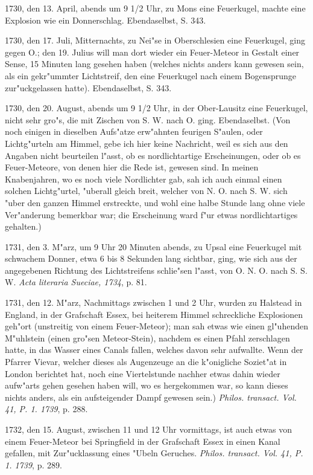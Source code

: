 \documentclass[a4paper, 11pt, oneside, polutonikogreek, german]{article}
\begin{document}
1730, den 13. April, abends um 9 1/2 Uhr, zu Mons eine Feuerkugel, machte eine Explosion wie ein Donnerschlag. Ebendaselbst, S. 343.

1730, den 17. Juli, Mitternachts, zu Nei"se in Oberschlesien eine Feuerkugel, ging gegen O.; den 19. Julius will man dort wieder ein Feuer-Meteor in Gestalt einer Sense, 15 Minuten lang gesehen haben (welches nichts anders kann gewesen sein, als ein gekr"ummter Lichtstreif, den eine Feuerkugel nach einem Bogensprunge zur"uckgelassen hatte). Ebendaselbst, S. 343.

1730, den 20. August, abends um 9 1/2 Uhr, in der Ober-Lausitz eine Feuerkugel, nicht sehr gro"s, die mit Zischen von S. W. nach O. ging. Ebendaselbst. (Von noch einigen in dieselben Aufs"atze erw"ahnten feurigen S"aulen, oder Lichtg"urteln am Himmel, gebe ich hier keine Nachricht, weil es sich aus den Angaben nicht beurteilen l"asst, ob es nordlichtartige Erscheinungen, oder ob es Feuer-Meteore, von denen hier die Rede ist, gewesen sind. In meinen Knabenjahren, wo es noch viele Nordlichter gab, sah ich auch einmal einen solchen Lichtg"urtel, "uberall gleich breit, welcher von N. O. nach S. W. sich "uber den ganzen Himmel erstreckte, und wohl eine halbe Stunde lang ohne viele Ver"anderung bemerkbar war; die Erscheinung ward f"ur etwas nordlichtartiges gehalten.)

1731, den 3. M"arz, um 9 Uhr 20 Minuten abends, zu Upsal eine Feuerkugel mit schwachem Donner, etwa 6 bis 8 Sekunden lang sichtbar, ging, wie sich aus der angegebenen Richtung des Lichtstreifens schlie"sen l"asst, von O. N. O. nach S. S. W. \emph{Acta literaria Sueciae, 1734}, p. 81.

1731, den 12. M"arz, Nachmittags zwischen 1 und 2 Uhr, wurden zu Halstead in England, in der Grafschaft Essex, bei heiterem Himmel schreckliche Explosionen geh"ort (unstreitig von einem Feuer-Meteor); man sah etwas wie einen gl"uhenden M"uhlstein (einen gro"sen Meteor-Stein), nachdem es einen Pfahl zerschlagen hatte, in das Wasser eines Canals fallen, welches davon sehr aufwallte. Wenn der Pfarrer Vievar, welcher dieses als Augenzeuge an die k"onigliche Soziet"at in London berichtet hat, noch eine Viertelstunde nachher etwas dahin wieder aufw"arts gehen gesehen haben will, wo es hergekommen war, so kann dieses nichts anders, als ein aufsteigender Dampf gewesen sein.) \emph{Philos. transact. Vol. 41, P. 1. 1739}, p. 288.

1732, den 15. August, zwischen 11 und 12 Uhr vormittags, ist auch etwas von einem Feuer-Meteor bei Springfield in der Grafschaft Essex in einen Kanal gefallen, mit Zur"ucklassung eines "Ubeln Geruches. \emph{Philos. transact. Vol. 41, P. 1. 1739}, p. 289.
\end{document}
